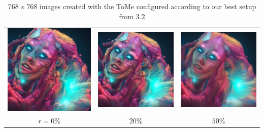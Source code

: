 \begin{table}[!htb]
\centering
\begin{tabular}{c c c}
    \includegraphics[width=0.3\linewidth]{static/sample_imgs/main_1x2/color_head_0.png} & \includegraphics[width=0.3\linewidth]{static/sample_imgs/main_1x2/color_head_20.png} &
    \includegraphics[width=0.3\linewidth]{static/sample_imgs/main_1x2/color_head_50.png}\\
    \(r=0\%\) & \(20\%\) & \(50\%\) \\
\end{tabular}
\caption{$768 \times 768$ images created with the ToMe configured according to our best setup from \(3.2\)}
\end{table}
